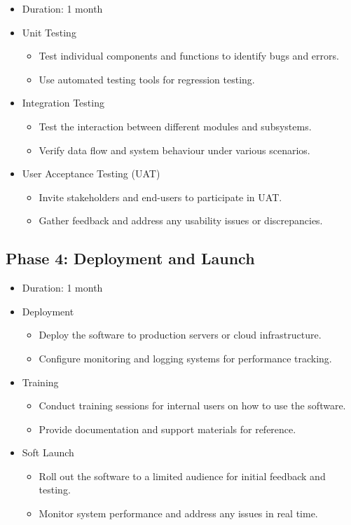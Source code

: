 \documentclass[12pt]{article}
\begin{document}
\begin{itemize}
    \item Duration: 1 month
    \item Unit Testing
        \begin{itemize}
            \item Test individual components and functions to identify bugs and errors.
            \item Use automated testing tools for regression testing.
        \end{itemize}
    \item Integration Testing
        \begin{itemize}
            \item Test the interaction between different modules and subsystems.
            \item Verify data flow and system behaviour under various scenarios.
        \end{itemize}
    \item User Acceptance Testing (UAT)
        \begin{itemize}
            \item Invite stakeholders and end-users to participate in UAT.
            \item Gather feedback and address any usability issues or discrepancies.
        \end{itemize}
\end{itemize}

\subsection*{\fontsize{13}{0}\selectfont Phase 4: Deployment and Launch}

\begin{itemize}
    \item Duration: 1 month
    \item Deployment
        \begin{itemize}
            \item Deploy the software to production servers or cloud infrastructure.
            \item Configure monitoring and logging systems for performance tracking.
        \end{itemize}
    \item Training
        \begin{itemize}
            \item Conduct training sessions for internal users on how to use the software.
            \item Provide documentation and support materials for reference.
        \end{itemize}
    \item Soft Launch
        \begin{itemize}
            \item Roll out the software to a limited audience for initial feedback and testing.
            \item Monitor system performance and address any issues in real time.
        \end{itemize}
\end{itemize}
\end{document}
